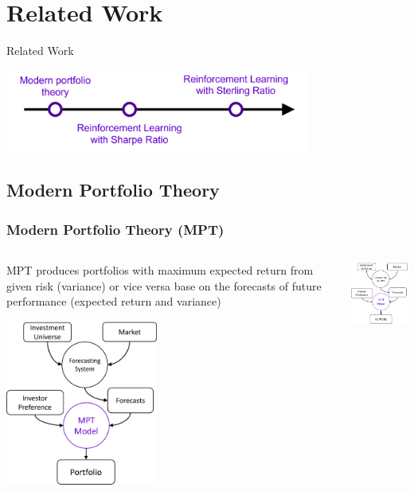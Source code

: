 \section{Related Work}

\begin{frame}{Related Work}
       \tableofcontents[sectionstyle=show/hide, hideothersubsections]
    \begin{center}
    \includegraphics[width=10cm]{images/related.png}
    \end{center}
\end{frame}

\subsection{Modern Portfolio Theory}
\begin{frame}
\frametitle{Modern Portfolio Theory (MPT)}
\begin{columns}
\begin{column}{0.55\textwidth}
MPT produces portfolios with maximum expected return from given risk (variance) or vice versa base on the forecasts of future performance (expected return and variance)
\begin{center}
\includegraphics[width=5cm]{images/mpt.png}
\end{center}
\end{column}
\begin{column}{0.45\textwidth}
\begin{center}
\includegraphics[width=4.8cm]{images/mpt.png}
\end{center}
\end{column}
\end{columns}
\end{frame}


